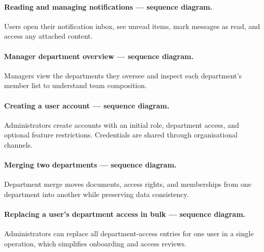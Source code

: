 \paragraph{Reading and managing notifications --- sequence diagram.}
Users open their notification inbox, see unread items, mark messages as read,
and access any attached content.


\paragraph{Manager department overview --- sequence diagram.}
Managers view the departments they oversee and inspect each department's member
list to understand team composition.


\paragraph{Creating a user account --- sequence diagram.}
Administrators create accounts with an initial role, department access, and
optional feature restrictions. Credentials are shared through organisational
channels.

\paragraph{Merging two departments --- sequence diagram.}
Department merge moves documents, access rights, and memberships from one
department into another while preserving data consistency.

\paragraph{Replacing a user's department access in bulk --- sequence diagram.}
Administrators can replace all department-access entries for one user in a single
operation, which simplifies onboarding and access reviews.

